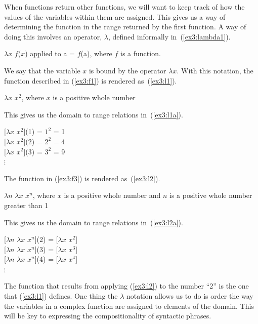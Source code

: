 When functions return other functions, we will want to keep track of how the values of the variables within them are assigned. This gives us a way of determining the function in the range returned by the first function. A way of doing this involves an operator, $\lambda$, defined informally in~(\ref{ex3:lambda1}).
\begin{exe}
	\raggedright
	\ex \label{ex3:lambda1} 
	$\lambda x$ $f$($x$) applied to a = $f$(a), where $f$ is a function.
\end{exe}
We say that the variable $x$ is bound by the operator $\lambda x$. With this notation, the function described in (\ref{ex3:f1}) is rendered as~(\ref{ex3:l1}).
\begin{exe}
	\raggedright
	\ex \label{ex3:l1} 
	$\lambda x$ $x^2$, where $x$ is a positive whole number
\end{exe}
This gives us the domain to range relations in~(\ref{ex3:l1a}).
\begin{exe}
	\raggedright
	\ex \label{ex3:l1a} 
	{}[$\lambda x$ $x^2$](1) = $1^2$ = 1\\
	{}[$\lambda x$ $x^2$](2) = $2^2$ = 4\\
	{}[$\lambda x$ $x^2$](3) = $3^2$ = 9\\
	\hspace*{40pt} $\vdots$
\end{exe}
The function in (\ref{ex3:f3}) is rendered as~(\ref{ex3:l2}).
\begin{exe}
	\raggedright
	\ex \label{ex3:l2} 
	$\lambda n$ $\lambda x$ $x^n$, where $x$ is a positive whole number and $n$ is a positive whole number greater than 1
\end{exe}
This gives us the domain to range relations in~(\ref{ex3:l2a}).
\begin{exe}
	\raggedright
	\ex \label{ex3:l2a} 
	{} [$\lambda n$ $\lambda x$ $x^n$](2) = [$\lambda x$ $x^2$]\\ 
	{} [$\lambda n$ $\lambda x$ $x^n$](3) = [$\lambda x$ $x^3$]\\
	{} [$\lambda n$ $\lambda x$ $x^n$](4) = [$\lambda x$ $x^4$]\\
	\hspace*{40pt} $\vdots$
\end{exe}
The function that results from applying (\ref{ex3:l2}) to the number ``2'' is the one that (\ref{ex3:l1}) defines. One thing the $\lambda$ notation allows us to do is order the way the variables in a complex function are assigned to elements of the domain. This will be key to expressing the compositionality of syntactic phrases.


